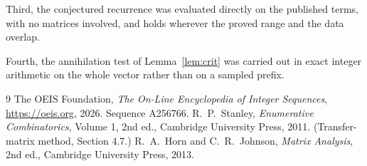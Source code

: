 \documentclass[11pt,a4paper]{article}
\theoremstyle{plain}
\theoremstyle{definition}
\begin{document}
Third, the conjectured recurrence was evaluated directly on the published terms, with no
matrices involved, and holds wherever the proved range and the data overlap.

Fourth, the annihilation test of Lemma~\ref{lem:crit} was carried out in exact integer
arithmetic on the whole vector rather than on a sampled prefix.

\begin{thebibliography}{9}
 The OEIS Foundation, \emph{The On-Line Encyclopedia of Integer
Sequences}, \url{https://oeis.org}, 2026. Sequence A256766.
 R.~P.~Stanley, \emph{Enumerative Combinatorics}, Volume 1, 2nd ed.,
Cambridge University Press, 2011. (Transfer-matrix method, Section 4.7.)
 R.~A.~Horn and C.~R.~Johnson, \emph{Matrix Analysis}, 2nd ed., Cambridge
University Press, 2013.
\end{thebibliography}
\end{document}
